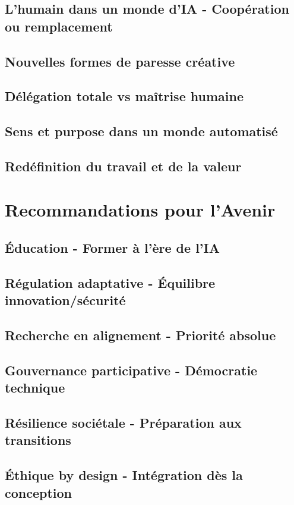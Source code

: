 \documentclass[12pt,a4paper]{book}
\begin{document}
\section{L'humain dans un monde d'IA - Coopération ou remplacement}
\section{Nouvelles formes de paresse créative}
\section{Délégation totale vs maîtrise humaine}
\section{Sens et purpose dans un monde automatisé}
\section{Redéfinition du travail et de la valeur}

\chapter{Recommandations pour l'Avenir}
\section{Éducation - Former à l'ère de l'IA}
\section{Régulation adaptative - Équilibre innovation/sécurité}
\section{Recherche en alignement - Priorité absolue}
\section{Gouvernance participative - Démocratie technique}
\section{Résilience sociétale - Préparation aux transitions}
\section{Éthique by design - Intégration dès la conception}
\end{document}
